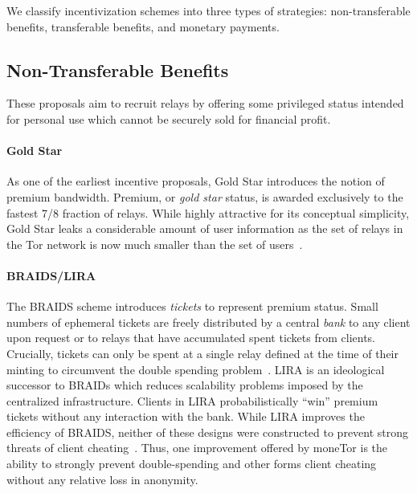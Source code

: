 We classify incentivization schemes into three types of strategies:
non-transferable benefits, transferable benefits, and monetary
payments.



\subsection{Non-Transferable Benefits}

These proposals aim to recruit relays by offering some privileged status
intended for personal use which cannot be securely sold for financial profit.

\paragraph*{Gold Star} As one of the earliest incentive proposals, Gold Star
introduces the notion of premium bandwidth. Premium, or \emph{gold star} status,
is awarded exclusively to the fastest 7/8 fraction of relays. While highly attractive
for its conceptual simplicity, Gold Star leaks a considerable amount of user
information as the set of relays in the Tor network is now much smaller than the set
of users~\cite{dingledine2010building}.

\paragraph*{BRAIDS/LIRA} The BRAIDS scheme introduces \emph{tickets} to represent
premium status. Small numbers of ephemeral tickets are freely distributed by a
central \emph{bank} to any client upon request or to relays that have
accumulated spent tickets from clients. Crucially, tickets can only be spent at
a single relay defined at the time of their minting to circumvent the double
spending problem~\cite{jansen2010recruiting}. LIRA is an ideological successor
to BRAIDs which reduces scalability problems imposed by the centralized
infrastructure. Clients in LIRA probabilistically ``win'' premium tickets
without any interaction with the bank. While LIRA improves the efficiency of
BRAIDS, neither of these designs were constructed to prevent strong threats of
client cheating~\cite{jansen2013lira}. Thus, one improvement offered by moneTor
is the ability to strongly prevent double-spending and other forms client
cheating without any relative loss in anonymity.

